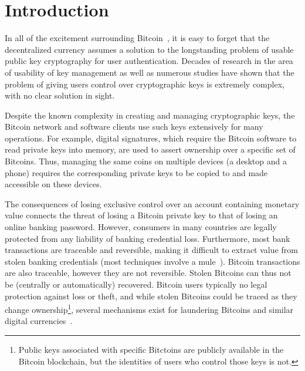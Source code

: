 

\section{Introduction}
In all of the excitement surrounding Bitcoin~\cite{Nak08}, it is easy to forget that the decentralized currency assumes a solution to the longstanding problem of usable public key cryptography for user authentication. Decades of research in the area of usability of key management as well as numerous studies have shown that the problem of giving users control over cryptographic keys is extremely complex, with no clear solution in sight. 

Despite the known complexity in creating and managing cryptographic keys, the Bitcoin network and software clients use such keys extensively for many operations. For example, digital signatures, which require the Bitcoin software to read private keys into memory, are used to assert ownership over a specific set of Bitcoins. Thus, managing the same coins on multiple devices (\eg a desktop and a phone) requires the corresponding private keys to be copied to and made accessible on these devices. 


The consequences of losing exclusive control over an account containing monetary value connects the threat of losing a Bitcoin private key to that of losing an online banking password. However, consumers in many countries are legally protected from any liability of banking credential loss. Furthermore, most bank transactions are traceable and reversible, making it difficult to extract value from stolen banking credentials (most techniques involve a mule~\cite{FH12}). Bitcoin transactions are also traceable, however they are not reversible. Stolen Bitcoins can thus not be (centrally or automatically) recovered. Bitcoin users typically no legal protection against loss or theft, and while stolen Bitcoins could be traced as they change ownership\footnote{Public keys associated with specific Bitctoins are publicly available in the Bitcoin blockchain, but the identities of users who control those keys is not.}, several mechanisms exist for laundering Bitcoins and similar digital currencies~\cite{MGGR13,BNMC+14}.

